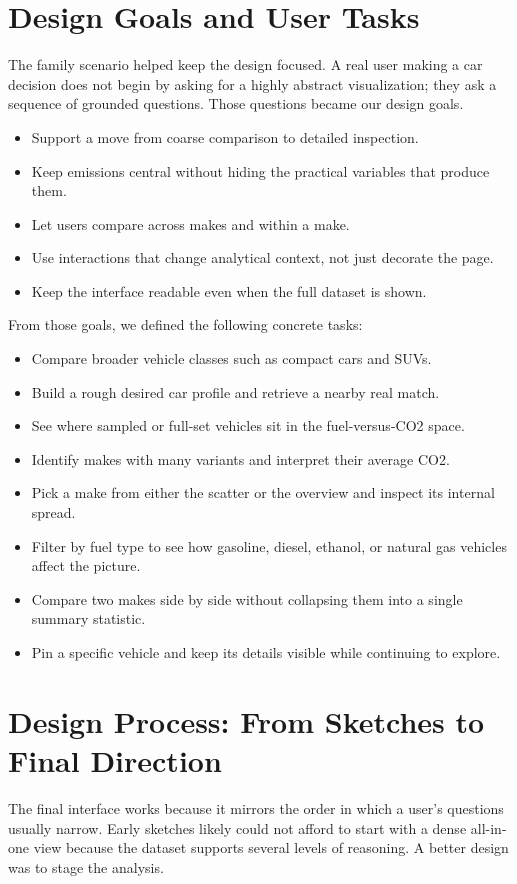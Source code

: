 \documentclass[12pt,letterpaper]{article}
\begin{document}
\section{Design Goals and User Tasks}
The family scenario helped keep the design focused. A real user making a car decision does not begin by asking for a highly abstract visualization; they ask a sequence of grounded questions. Those questions became our design goals.

\begin{itemize}
\item Support a move from coarse comparison to detailed inspection.
\item Keep emissions central without hiding the practical variables that produce them.
\item Let users compare across makes and within a make.
\item Use interactions that change analytical context, not just decorate the page.
\item Keep the interface readable even when the full dataset is shown.
\end{itemize}

From those goals, we defined the following concrete tasks:

\begin{itemize}
\item Compare broader vehicle classes such as compact cars and SUVs.
\item Build a rough desired car profile and retrieve a nearby real match.
\item See where sampled or full-set vehicles sit in the fuel-versus-CO2 space.
\item Identify makes with many variants and interpret their average CO2.
\item Pick a make from either the scatter or the overview and inspect its internal spread.
\item Filter by fuel type to see how gasoline, diesel, ethanol, or natural gas vehicles affect the picture.
\item Compare two makes side by side without collapsing them into a single summary statistic.
\item Pin a specific vehicle and keep its details visible while continuing to explore.
\end{itemize}

\section{Design Process: From Sketches to Final Direction}
The final interface works because it mirrors the order in which a user's questions usually narrow. Early sketches likely could not afford to start with a dense all-in-one view because the dataset supports several levels of reasoning. A better design was to stage the analysis.
\end{document}
